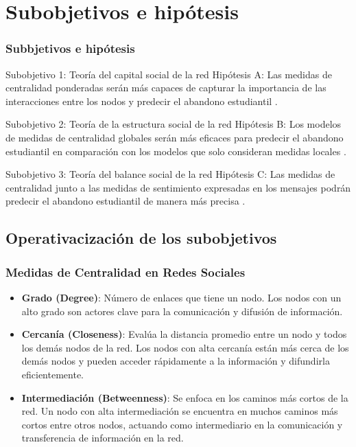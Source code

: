 \documentclass{beamer}
\begin{document}
\section{Subobjetivos e hipótesis}
\begin{frame}
	\frametitle{Subbjetivos e hipótesis}
	\begin{block}{Subobjetivo 1: Teoría del capital social de la red}
		Hipótesis A: Las medidas de centralidad ponderadas serán más capaces de capturar la importancia de las interacciones entre los nodos y predecir el abandono estudiantil \citep{wasko_why_2005}.
		
	\end{block}
	\begin{block}{Subobjetivo 2: Teoría de la estructura social de la red}
		Hipótesis B: Los modelos de medidas de centralidad globales serán más eficaces para predecir el abandono estudiantil en comparación con los modelos que solo consideran medidas locales \citep{krause_social_2007}.
		
	\end{block}
	\begin{block}{Subobjetivo 3: Teoría del balance social de la red}
		Hipótesis C: Las medidas de centralidad junto a las medidas de sentimiento expresadas en los mensajes podrán predecir el abandono estudiantil de manera más precisa \citep{kim2012a}.
	\end{block}
\end{frame}



\subsection{Operativacización de los subobjetivos}

\begin{frame}
	\frametitle{Medidas de Centralidad en Redes Sociales}
	
	\begin{itemize}
		\item \textbf{Grado (Degree)}: Número de enlaces que tiene un nodo. Los nodos con un alto grado son actores clave para la comunicación y difusión de información.
		
		\item \textbf{Cercanía (Closeness)}: Evalúa la distancia promedio entre un nodo y todos los demás nodos de la red. Los nodos con alta cercanía están más cerca de los demás nodos y pueden acceder rápidamente a la información y difundirla eficientemente.
		
		\item \textbf{Intermediación (Betweenness)}: Se enfoca en los caminos más cortos de la red. Un nodo con alta intermediación se encuentra en muchos caminos más cortos entre otros nodos, actuando como intermediario en la comunicación y transferencia de información en la red.
	\end{itemize}
	
\end{frame}
\end{document}
